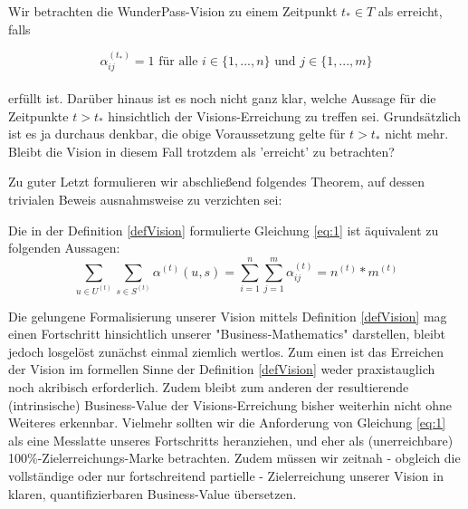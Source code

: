 \begin{Def}\label{defVision}

Wir betrachten die WunderPass-Vision zu einem Zeitpunkt $t_{*} \in T$ als erreicht, falls

\vspace{0.3cm}

\begin{equation}
\label{eq:1}
  \alpha^{(t_{*})}_{ij} = 1 \textrm{ für alle } i \in \{1,...,n\} \textrm{ und } j \in \{1,...,m\}
\end{equation}\\
erfüllt ist. Darüber hinaus ist es noch nicht ganz klar, welche Aussage für die Zeitpunkte $t > t_{*}$ hinsichtlich der Visions-Erreichung zu treffen sei. Grundsätzlich ist es ja durchaus denkbar, die obige Voraussetzung gelte für $t > t_{*}$ nicht mehr. Bleibt die Vision in diesem Fall trotzdem als 'erreicht' zu betrachten?

\end{Def}

\vspace{1cm}

Zu guter Letzt formulieren wir abschließend folgendes Theorem, auf dessen trivialen Beweis ausnahmsweise zu verzichten sei:

\vspace{0.3cm}

\begin{Theorem}
Die in der Definition \ref{defVision} formulierte Gleichung \eqref{eq:1} ist äquivalent zu folgenden Aussagen: 
\begin{equation*}
  \sum_{u \in U^{(t)}} \sum_{s \in S^{(t)}} \alpha^{(t)}(u, s) = \sum_{i=1}^n \sum_{j=1}^m \alpha^{(t)}_{ij} = n^{(t)} * m^{(t)}
\end{equation*}
\end{Theorem}

\vspace{1cm}

Die gelungene Formalisierung unserer Vision mittels Definition \ref{defVision} mag einen Fortschritt hinsichtlich unserer "Business-Mathematics" darstellen, bleibt jedoch losgelöst zunächst einmal ziemlich wertlos. Zum einen ist das Erreichen der Vision im formellen Sinne der Definition \ref{defVision} weder praxistauglich noch akribisch erforderlich. Zudem bleibt zum anderen der resultierende (intrinsische) Business-Value der Visions-Erreichung bisher weiterhin nicht ohne Weiteres erkennbar.
Vielmehr sollten wir die Anforderung von Gleichung \eqref{eq:1} als eine Messlatte unseres Fortschritts heranziehen, und eher als (unerreichbare) 100\%-Zielerreichungs-Marke betrachten. Zudem müssen wir zeitnah - obgleich die vollständige oder nur fortschreitend partielle - Zielerreichung unserer Vision in klaren, quantifizierbaren Business-Value übersetzen.


